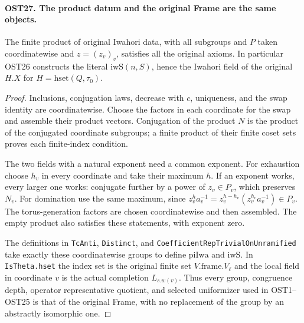\documentclass[11pt,a4paper]{article}
\numberwithin{equation}{section}
\theoremstyle{remark}\newtheorem{remark}[theorem]{Remark}
\begin{document}
\paragraph{OST27. The product datum and the original Frame are the same objects.}
\label{claim:OST27}
The finite product of original Iwahori data, with all subgroups
and $P$ taken coordinatewise and $z=(z_v)_v$, satisfies all
the original axioms.  In particular OST26 constructs the
literal $\mathrm{iwS}(n,\allowbreak{} S)$, hence the Iwahori field of the
original $H.X$ for $H=\mathrm{hset}(Q,\tau_0)$.
\begin{proof}
Inclusions, conjugation laws, decrease with $c$, uniqueness,
and the swap identity are coordinatewise.  Choose the factors
in each coordinate for the swap and assemble their product
vectors.  Conjugation of the product $N$ is the product of
the conjugated coordinate subgroups; a finite product of their
finite coset sets proves each finite-index condition.

The two fields with a natural exponent need a common exponent.
For exhaustion choose $h_v$ in every coordinate and take their
maximum $h$.  If an exponent works, every larger one works:
conjugate further by a power of $z_v\in P_v$, which preserves
$N_v$.  For domination use the same maximum, since
$z_v^h a_v^{-1}=z_v^{h-h_v}(z_v^{h_v}a_v^{-1})\in P_v$.
The torus-generation factors are chosen coordinatewise and
then assembled.  The empty product also satisfies these
statements, with exponent zero.

The definitions in \texttt{Tc\allowbreak Anti}, \texttt{Distinct}, and
\texttt{Coefficient\allowbreak Rep\allowbreak Trivial\allowbreak On\allowbreak Unramified} take exactly these
coordinatewise groups to define $\mathrm{piIwa}$ and
$\mathrm{iwS}$.  In \texttt{Is\allowbreak Theta.\allowbreak hset} the index set is
the original finite set $V.\mathrm{frame}.V_\ell$ and the
local field in coordinate $v$ is the actual completion
$L_{s.w(v)}$.  Thus every group, congruence depth, operator
representative quotient, and selected uniformizer used in
OST1--OST25 is that of the original Frame, with no replacement
of the group by an abstractly isomorphic one.
\end{proof}

\end{document}
